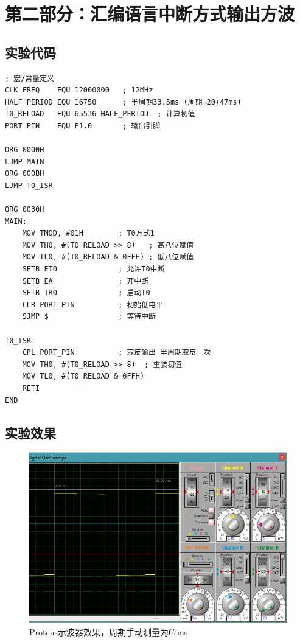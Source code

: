\documentclass[12pt,hyperref,a4paper,UTF8]{ctexart}
\begin{document}
\section{第二部分：汇编语言中断方式输出方波}


\subsection{实验代码}

\begin{lstlisting}[language={[x86masm]Assembler}, caption={实验程序}]
; 宏/常量定义
CLK_FREQ    EQU 12000000   ; 12MHz
HALF_PERIOD EQU 16750      ; 半周期33.5ms (周期=20+47ms)
T0_RELOAD   EQU 65536-HALF_PERIOD  ; 计算初值
PORT_PIN    EQU P1.0       ; 输出引脚

ORG 0000H
LJMP MAIN
ORG 000BH
LJMP T0_ISR

ORG 0030H
MAIN:
    MOV TMOD, #01H        ; T0方式1
    MOV TH0, #(T0_RELOAD >> 8)   ; 高八位赋值
    MOV TL0, #(T0_RELOAD & 0FFH) ; 低八位赋值
    SETB ET0              ; 允许T0中断
    SETB EA               ; 开中断
    SETB TR0              ; 启动T0
    CLR PORT_PIN          ; 初始低电平
    SJMP $                ; 等待中断

T0_ISR:
    CPL PORT_PIN          ; 取反输出 半周期取反一次
    MOV TH0, #(T0_RELOAD >> 8)  ; 重装初值
    MOV TL0, #(T0_RELOAD & 0FFH)
    RETI
END
\end{lstlisting}

\subsection{实验效果}

\begin{figure}[H] %
    \centering
    \includegraphics[width=1\textwidth]{figures/202.png} %
    \caption{Proteus示波器效果，周期手动测量为67ms} %
    \label{fig:example} %
\end{figure}
\end{document}
